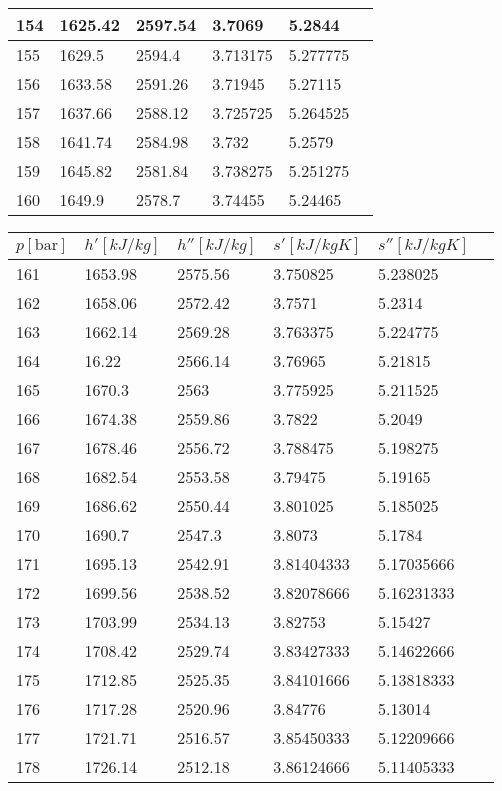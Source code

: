 \documentclass[twocolumn]{article}
\begin{document}
\begin{tabular}{l|l|l|l|l|l}
154	&	1625.42	&	2597.54	&	3.7069	&	5.2844 \\ \hline
155	&	1629.5	&	2594.4	&	3.713175	&	5.277775 \\ \hline
156	&	1633.58	&	2591.26	&	3.71945	&	5.27115 \\ \hline
157	&	1637.66	&	2588.12	&	3.725725	&	5.264525 \\ \hline
158	&	1641.74	&	2584.98	&	3.732	&	5.2579 \\ \hline
159	&	1645.82	&	2581.84	&	3.738275	&	5.251275 \\ \hline
160	&	1649.9	&	2578.7	&	3.74455	&	5.24465 \\ \hline
\end{tabular}

\begin{tabular}{l|l|l|l|l|l}
	$p [\text{bar}] $ & $h' [kJ/kg]$ & $h'' [kJ/kg]$ & $s' [kJ/kg K] $ & $s'' [kJ/kg K]$ \\ \hline
161	&	1653.98	&	2575.56	&	3.750825	&	5.238025 \\ \hline
162	&	1658.06	&	2572.42	&	3.7571	&	5.2314 \\ \hline
163	&	1662.14	&	2569.28	&	3.763375	&	5.224775 \\ \hline
164	&	16.22	&	2566.14	&	3.76965	&	5.21815 \\ \hline
165	&	1670.3	&	2563	&	3.775925	&	5.211525 \\ \hline
166	&	1674.38	&	2559.86	&	3.7822	&	5.2049 \\ \hline
167	&	1678.46	&	2556.72	&	3.788475	&	5.198275 \\ \hline
168	&	1682.54	&	2553.58	&	3.79475	&	5.19165 \\ \hline
169	&	1686.62	&	2550.44	&	3.801025	&	5.185025 \\ \hline
170	&	1690.7	&	2547.3	&	3.8073	&	5.1784 \\ \hline
171	&	1695.13	&	2542.91	&	3.81404333	&	5.17035666 \\ \hline
172	&	1699.56	&	2538.52	&	3.82078666	&	5.16231333 \\ \hline
173	&	1703.99	&	2534.13	&	3.82753	&	5.15427 \\ \hline
174	&	1708.42	&	2529.74	&	3.83427333	&	5.14622666 \\ \hline
175	&	1712.85	&	2525.35	&	3.84101666	&	5.13818333 \\ \hline
176	&	1717.28	&	2520.96	&	3.84776	&	5.13014 \\ \hline
177	&	1721.71	&	2516.57	&	3.85450333	&	5.12209666 \\ \hline
178	&	1726.14	&	2512.18	&	3.86124666	&	5.11405333 \\ \hline

\end{tabular}
\end{document}
